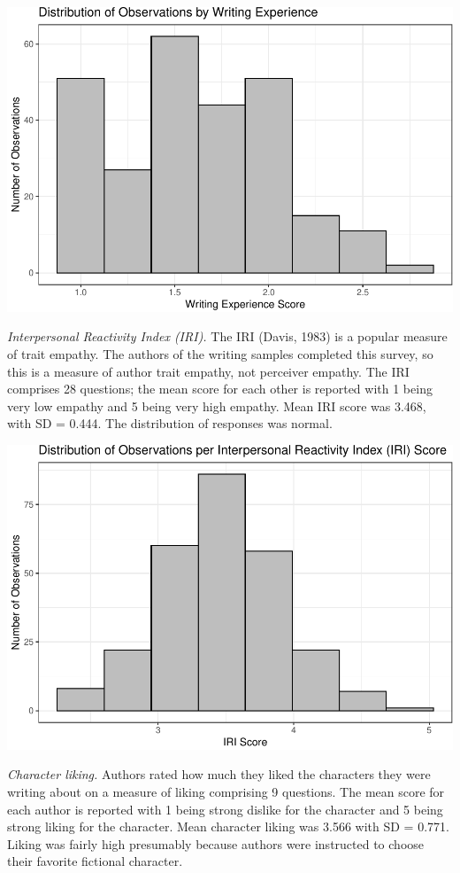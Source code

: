 \documentclass[
  man,floatsintext]{apa6}
\begin{document}
\includegraphics{Final_Eliott_files/figure-latex/unnamed-chunk-3-1.pdf}

\emph{Interpersonal Reactivity Index (IRI).} The IRI (Davis, 1983) is a popular measure of trait empathy. The authors of the writing samples completed this survey, so this is a measure of author trait empathy, not perceiver empathy. The IRI comprises 28 questions; the mean score for each other is reported with 1 being very low empathy and 5 being very high empathy. Mean IRI score was 3.468, with SD = 0.444. The distribution of responses was normal.

\includegraphics{Final_Eliott_files/figure-latex/unnamed-chunk-5-1.pdf}

\emph{Character liking.} Authors rated how much they liked the characters they were writing about on a measure of liking comprising 9 questions. The mean score for each author is reported with 1 being strong dislike for the character and 5 being strong liking for the character. Mean character liking was 3.566 with SD = 0.771. Liking was fairly high presumably because authors were instructed to choose their favorite fictional character.
\end{document}

